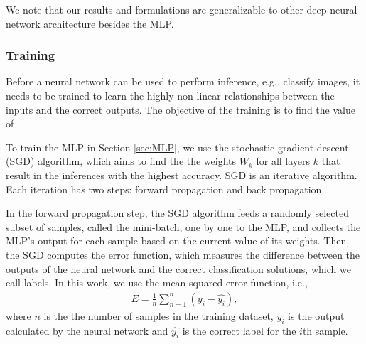 \documentclass[conference]{IEEEtran}
\begin{document}

We note that our results and formulations are generalizable to other deep neural network architecture besides the MLP. 

\subsubsection{Training}\label{sec:training}
Before a neural network can be used to perform inference, e.g., classify images, it needs to be trained to learn the highly non-linear
relationships between the inputs and the correct outputs. The objective of the training is to find the value of 

To train the MLP in Section \ref{sec:MLP}, we use the stochastic gradient descent (SGD) algorithm, which aims to find the 
the weights $W_k$ for all layers $k$ that result in the inferences with the highest accuracy.  SGD is an iterative algorithm. Each
iteration has two steps: forward propagation and back propagation.

In the forward propagation step, the SGD algorithm feeds a randomly
selected subset of samples, called the mini-batch, one by one to the MLP, and collects the MLP's output for each sample based on the
current value of its weights.
Then, the SGD computes the error function, which measures the difference between the outputs of the neural network and the correct 
classification solutions, which we call labels. In this work, we use the mean squared error function, i.e., 
\begin{align}\label{eq:errorFunction}
 E= \frac{1}{n} \sum_{n=1}^{n}(y_i -\hat{y_i}),
\end{align}
where $n$ is the the number of samples in the training dataset, $y_i$ is the output calculated by the neural network and 
$\hat{y_i}$ is the correct label for the $i$th sample.
\end{document}
